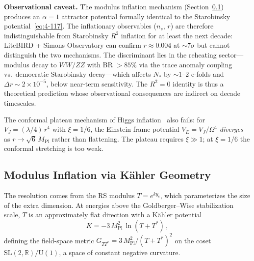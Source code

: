 \textbf{Observational caveat.} The modulus inflation mechanism (Section~\ref{sec:4-modulus-inflation}) produces an $\alpha = 1$ attractor potential formally identical to the Starobinsky potential~\eqref{eq:4-117}. The inflationary observables ($n_s$, $r$) are therefore indistinguishable from Starobinsky $R^2$ inflation for at least the next decade: LiteBIRD + Simons Observatory can confirm $r \approx 0.004$ at $\sim 7\sigma$ but cannot distinguish the two mechanisms. The discriminant lies in the reheating sector---modulus decay to $WW/ZZ$ with BR $> 85\%$ via the trace anomaly coupling vs.\ democratic Starobinsky decay---which affects $N_*$ by $\sim 1$--$2$ e-folds and $\Delta r \sim 2 \times 10^{-5}$, below near-term sensitivity. The $R^2 = 0$ identity is thus a theoretical prediction whose observational consequences are indirect on decade timescales.

The conformal plateau mechanism of Higgs inflation~\cite{ch4:BezrukovShaposhnikov2008} also fails: for $V_J = (\lambda/4)\, r^4$ with $\xi = 1/6$, the Einstein-frame potential $V_E = V_J/\Omega^4$ \emph{diverges} as $r \to \sqrt{6}\, M_{\mathrm{Pl}}$ rather than flattening. The plateau requires $\xi \gg 1$; at $\xi = 1/6$ the conformal stretching is too weak.

\subsection{Modulus Inflation via K\"ahler Geometry}
\label{sec:4-modulus-inflation}

The resolution comes from the RS modulus $T = e^{ky_c}$, which parameterizes the size of the extra dimension. At energies above the Goldberger--Wise stabilization scale, $T$ is an approximately flat direction with a K\"ahler potential
\begin{equation}
  K = -3\, M_{\mathrm{Pl}}^2\, \ln(T + T^*)\,,
  \label{eq:4-115}
\end{equation}
defining the field-space metric $G_{TT^*} = 3\, M_{\mathrm{Pl}}^2/(T + T^*)^2$ on the coset $\mathrm{SL}(2,\mathbb{R})/\mathrm{U}(1)$, a space of constant negative curvature.


